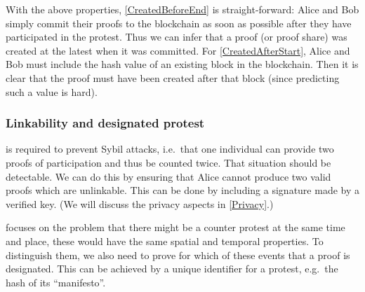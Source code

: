 With the above properties, \cref{CreatedBeforeEnd} is straight-forward: Alice 
and Bob simply commit their proofs to the blockchain as soon as possible after 
they have participated in the protest.
Thus we can infer that a proof (or proof share) was created at the latest when 
it was committed.
For \cref{CreatedAfterStart}, Alice and Bob must include the hash value of an 
existing block in the blockchain.
Then it is clear that the proof must have been created after that block (since 
predicting such a value is hard).

\subsubsection{Linkability and designated protest}

 is required to prevent Sybil attacks, i.e.\ that one 
individual can provide two proofs of participation and thus be counted twice.
That situation should be detectable.
We can do this by ensuring that Alice cannot produce two valid proofs which
are unlinkable.
This can be done by including a signature made by a verified key.
(We will discuss the privacy aspects in \cref{Privacy}.)

 focuses on the problem that there might be a counter 
protest at the same time and place, these would have the same spatial and 
temporal properties.
To distinguish them, we also need to prove for which of these events that a 
proof is designated.
This can be achieved by a unique identifier for a protest, e.g.\ the hash of 
its \enquote{manifesto}.

